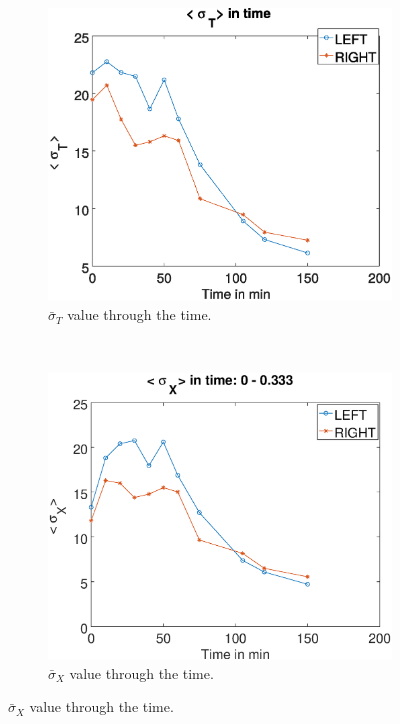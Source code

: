 \documentclass[review]{elsarticle}
\begin{document}
\begin{figure}[h!]
    \centering
    \begin{subfigure}[b]{0.475\textwidth}
        \includegraphics[width=\textwidth]{std-all.eps}
	\caption{$\bar{\sigma}_T$ value through  the time.}
        \label{fig:allink}
    \end{subfigure}
    ~
    \begin{subfigure}[b]{0.475\textwidth}
        \includegraphics[width=\textwidth]{std-bandx.eps}
	\caption{$\bar{\sigma}_X$ value through  the time.}

\end{subfigure}
\end{figure}
\end{document}
